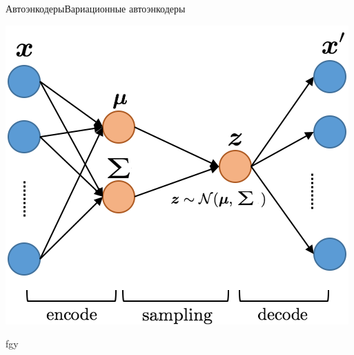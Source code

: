 \documentclass{beamer}
\begin{document}
\begin{frame}{Автоэнкодеры}{Вариационные автоэнкодеры}

\begin{minipage}{0.4\textwidth}
	\begin{flushleft}
		\includegraphics[scale=0.7]{vae}
	\end{flushleft}
\end{minipage}
\hfill
\begin{minipage}{0.4\textwidth}
	\begin{center}
		fgy
	\end{center}
\end{minipage}

\end{frame}
\end{document}
